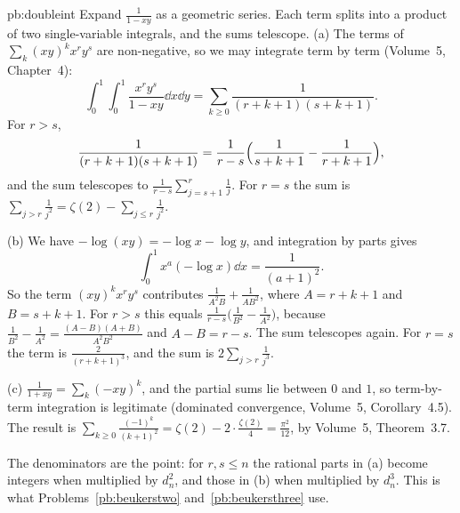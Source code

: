 \begin{solution}{pb:doubleint}
\idea Expand $\frac1{1-xy}$ as a geometric series. Each term splits into a product of two single-variable integrals, and the sums telescope.
\writeup (a) The terms of $\sum_k(xy)^kx^ry^s$ are non-negative, so we may integrate term by term (Volume~5, Chapter~4):
\[
\int_0^1\!\!\int_0^1\frac{x^ry^s}{1-xy}\dd x\dd y=\sum_{k\ge0}\frac1{(r+k+1)(s+k+1)}.
\]
For $r>s$,
\[
\frac1{(r+k+1)(s+k+1)}=\frac1{r-s}\Bigl(\frac1{s+k+1}-\frac1{r+k+1}\Bigr),
\]
and the sum telescopes to $\frac1{r-s}\sum_{j=s+1}^r\frac1j$. For
$r=s$ the sum is $\sum_{j>r}\frac1{j^2}=\zeta(2)-\sum_{j\le r}\frac1{j^2}$.

(b) We have $-\log(xy)=-\log x-\log y$, and integration by parts gives
\[
\int_0^1x^a(-\log x)\dd x=\frac1{(a+1)^2}.
\]
So the term $(xy)^kx^ry^s$ contributes $\frac1{A^2B}+\frac1{AB^2}$, where $A=r+k+1$ and $B=s+k+1$. For $r>s$ this equals
$\frac1{r-s}\bigl(\frac1{B^2}-\frac1{A^2}\bigr)$, because $\frac1{B^2}-\frac1{A^2}=\frac{(A-B)(A+B)}{A^2B^2}$ and $A-B=r-s$. The sum telescopes again. For $r=s$ the term is
$\frac2{(r+k+1)^3}$, and the sum is $2\sum_{j>r}\frac1{j^3}$.

(c) $\frac1{1+xy}=\sum_k(-xy)^k$, and the partial sums lie between $0$ and $1$, so term-by-term integration is legitimate (dominated
convergence, Volume~5, Corollary~4.5). The result is $\sum_{k\ge0}\frac{(-1)^k}{(k+1)^2}=\zeta(2)-2\cdot\frac{\zeta(2)}4=\frac{\pi^2}{12}$, by Volume~5, Theorem~3.7.

\leads The denominators are the point: for $r,s\le n$ the rational parts in (a) become integers when multiplied by $d_n^2$, and those
in (b) when multiplied by $d_n^3$. This is what Problems~\ref{pb:beukerstwo} and~\ref{pb:beukersthree} use.
\end{solution}

